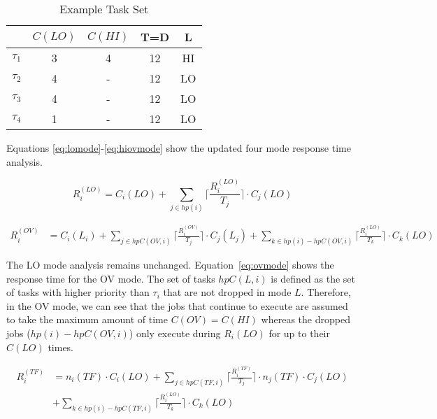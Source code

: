 	
	\begin{table}[h]
\caption{Example Task Set}
\centering

	\begin{tabular}{@{}lcccc@{}}
	\toprule
	& $C(LO)$ & $C(HI)$ & T=D & L 	 \\
	\bottomrule
	$\tau_1$ & 3 & 4 & 12 & HI  \\
	$\tau_2$ & 4 & - & 12 & LO  \\
	$\tau_3$ & 4 & - & 12 & LO  \\
	$\tau_4$ & 1 & - & 12 & LO  \\
	\end{tabular}

\label{t:example}
\end{table}
	
	Equations \ref{eq:lomode}-\ref{eq:hiovmode} show the updated four mode response time analysis.
	
	
\begin{equation}
R_i^{(LO)}= C_i(LO)+\sum_{j \in hp(i)}\Big\lceil\frac{R_i^{(LO)}}{T_j}\Big\rceil \cdot C_j(LO)
\label{eq:lomode}
\end{equation}

\begin{equation}\label{eq:ovmode}
\begin{aligned}
R_i^{(OV)} &  = C_i(L_i)+\sum_{j \in hpC(OV,i)}\Big\lceil\frac{R_i^{(OV)}}{T_j}\Big\rceil \cdot C_j(L_j) 
 +\sum_{k \in hp(i)-hpC(OV,i)}\Big\lceil\frac{R_i^{(LO)}}{T_k}\Big\rceil \cdot C_k(LO)
\end{aligned}
\end{equation}
	
	
	The LO mode analysis remains unchanged. Equation~\ref{eq:ovmode} shows the response time for the OV mode. 
	The set of tasks $hpC(L,i)$ is defined as the set of tasks with higher priority than $\tau_i$ that are not dropped in mode $L$. 
	Therefore, in the OV mode, we can see that the jobs that continue to execute are assumed to take the maximum amount of time $C(OV)=C(HI)$ whereas the dropped jobs ($hp(i) - hpC(OV,i)$) only execute during $R_i(LO)$ for up to their $C(LO)$ times.
	
\begin{equation}\label{eq:tfmode}
\begin{aligned}
R_i^{(TF)} & = n_i(TF) \cdot C_i(LO)
+\sum_{j \in hpC(TF,i)}\Big\lceil\frac{R_i^{(TF)}}{T_j}\Big\rceil \cdot n_j(TF) \cdot C_j(LO) \\
&  +\sum_{k \in hp(i)-hpC(TF,i)}\Big\lceil\frac{R_i^{(LO)}}{T_k}\Big\rceil \cdot C_k(LO)
\end{aligned}
\end{equation}

